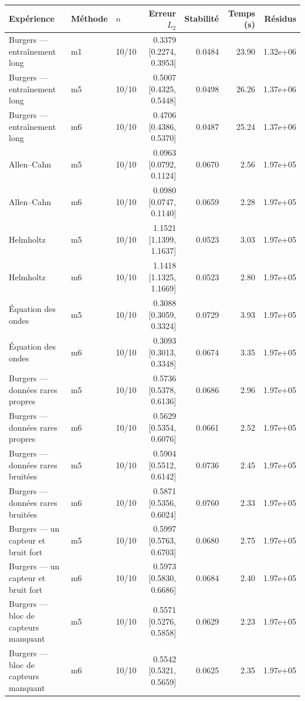 \begin{tabular}{lllrrrr}
\toprule
Expérience & Méthode & $n$ & Erreur $L_2$ & Stabilité & Temps (s) & Résidus \\
\midrule
Burgers — entraînement long & m1 & 10/10 & 0.3379 [0.2274, 0.3953] & 0.0484 & 23.90 & 1.32e+06 \\
Burgers — entraînement long & m5 & 10/10 & 0.5007 [0.4325, 0.5448] & 0.0498 & 26.26 & 1.37e+06 \\
Burgers — entraînement long & m6 & 10/10 & 0.4706 [0.4386, 0.5370] & 0.0487 & 25.24 & 1.37e+06 \\
Allen–Cahn & m5 & 10/10 & 0.0963 [0.0792, 0.1124] & 0.0670 & 2.56 & 1.97e+05 \\
Allen–Cahn & m6 & 10/10 & 0.0980 [0.0747, 0.1140] & 0.0659 & 2.28 & 1.97e+05 \\
Helmholtz & m5 & 10/10 & 1.1521 [1.1399, 1.1637] & 0.0523 & 3.03 & 1.97e+05 \\
Helmholtz & m6 & 10/10 & 1.1418 [1.1325, 1.1669] & 0.0523 & 2.80 & 1.97e+05 \\
Équation des ondes & m5 & 10/10 & 0.3088 [0.3059, 0.3324] & 0.0729 & 3.93 & 1.97e+05 \\
Équation des ondes & m6 & 10/10 & 0.3093 [0.3013, 0.3348] & 0.0674 & 3.35 & 1.97e+05 \\
Burgers — données rares propres & m5 & 10/10 & 0.5736 [0.5378, 0.6136] & 0.0686 & 2.96 & 1.97e+05 \\
Burgers — données rares propres & m6 & 10/10 & 0.5629 [0.5354, 0.6076] & 0.0661 & 2.52 & 1.97e+05 \\
Burgers — données rares bruitées & m5 & 10/10 & 0.5904 [0.5512, 0.6142] & 0.0736 & 2.45 & 1.97e+05 \\
Burgers — données rares bruitées & m6 & 10/10 & 0.5871 [0.5356, 0.6024] & 0.0760 & 2.33 & 1.97e+05 \\
Burgers — un capteur et bruit fort & m5 & 10/10 & 0.5997 [0.5763, 0.6703] & 0.0680 & 2.75 & 1.97e+05 \\
Burgers — un capteur et bruit fort & m6 & 10/10 & 0.5973 [0.5830, 0.6686] & 0.0684 & 2.40 & 1.97e+05 \\
Burgers — bloc de capteurs manquant & m5 & 10/10 & 0.5571 [0.5276, 0.5858] & 0.0629 & 2.23 & 1.97e+05 \\
Burgers — bloc de capteurs manquant & m6 & 10/10 & 0.5542 [0.5321, 0.5659] & 0.0625 & 2.35 & 1.97e+05 \\
\bottomrule
\end{tabular}
